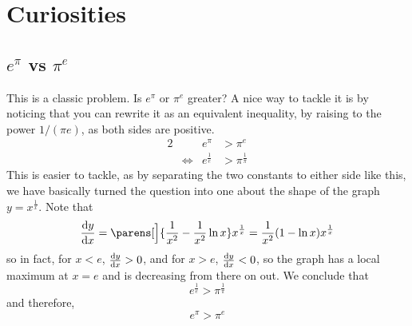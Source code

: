 \section{Curiosities}

\subsection[\texorpdfstring{\(e^\pi\) vs \(\pi^e\)}{e\^{}pi vs pi\^{}e}]
           {\boldmath\(e^\pi\) vs \(\pi^e\)}

This is a classic problem. Is \(e^\pi\) or \(\pi^e\) greater? A nice way to
tackle it is by noticing that you can rewrite it as an equivalent inequality, by
raising to the power \(1 / (\pi e)\), as both sides are positive.
\begin{alignat*}2
 && e^\pi &> \pi^e \\
 &\iff{}& e^{\frac 1e} &> \pi^{\frac 1\pi}
\end{alignat*}
This is easier to tackle, as by separating the two constants to either side like
this, we have basically turned the question into one about the shape of the
graph \(y = x^{\frac 1x}\). Note that
\begin{equation*}
 \dv<y>{x} = \parens[\Big]{\frac 1{x^2} - \frac 1{x^2}\ln x} x^{\frac 1x}
           = \frac 1{x^2} (1 - \ln x) x^{\frac 1x}
\end{equation*}
so in fact, for \(x < e\), \(\dv<y>{x} > 0\), and for
\(x > e\), \(\dv<y>{x} < 0\), so the graph has a local maximum at \(x = e\) and
is decreasing from there on out. We conclude that
\begin{equation*}
 e^{\frac 1e} > \pi^{\frac 1\pi}
\end{equation*}
and therefore,
\begin{equation*}
 e^\pi > \pi^e
\end{equation*}
